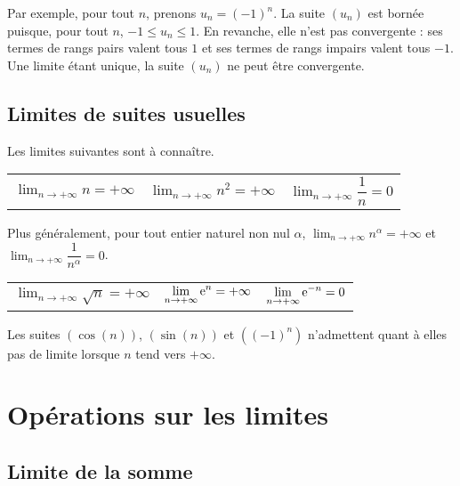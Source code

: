 \documentclass[11pt,fleqn]{book} %
\begin{document}
Par exemple, pour tout $n$, prenons $u_n=(-1)^n$. La suite $(u_n)$ est bornée puisque, pour tout $n$, $-1 \leqslant u_n \leqslant 1$. En revanche, elle n'est pas convergente : ses termes de rangs pairs valent tous $1$ et ses termes de rangs impairs valent tous $-1$. Une limite étant unique, la suite $(u_n)$ ne peut être convergente.

\subsection{Limites de suites usuelles}

\begin{proposition} Les limites suivantes sont à connaître.
\begin{center}
\begin{tabularx}{0.9\linewidth}{XXX}
 $\displaystyle \lim _{n\to+\infty} n = + \infty$ & $\displaystyle \lim _{n\to+\infty} n^{2} = + \infty$ &  $\displaystyle \lim _{n\to+\infty} \dfrac{1}{n} = 0$ \end{tabularx}
\end{center}

Plus généralement, pour tout entier naturel non nul $\alpha$, $\displaystyle \lim _{n\to+\infty} n^{\alpha} = + \infty$ et $\displaystyle \lim _{n\to+\infty} \dfrac{1}{n^{\alpha}} = 0$.
\begin{center}
\begin{tabularx}{0.9\linewidth}{XXX}
  $\displaystyle \lim _{n\to+\infty} \sqrt{n} = + \infty$ & $\displaystyle \lim _{n\to+\infty} \mathrm{e}^n = + \infty$ & $\displaystyle \lim _{n\to+\infty} \mathrm{e}^{-n} = 0$\end{tabularx}
\end{center}

 Les suites $(\cos(n))$, $(\sin(n))$ et $((-1)^n)$ n'admettent quant à elles pas de limite lorsque $n$ tend vers $+\infty$.
\end{proposition}

\newpage
\section{Opérations sur les limites}

\subsection{Limite de la somme}
\end{document}
